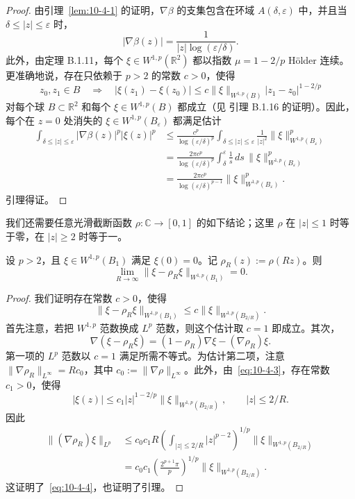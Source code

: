 \begin{proof}
由引理~\ref{lem:10-4-1} 的证明，$\nabla\beta$ 的支集包含在环域
$A(\delta,\varepsilon)$ 中，并且当 $\delta\le|z|\le\varepsilon$ 时，
\[
  |\nabla\beta(z)|=\frac{1}{|z|\log(\varepsilon/\delta)}.
\]
此外，由定理 B.1.11，每个 $\xi\in W^{1,p}(\mathbb R^2)$ 都以指数
$\mu=1-2/p$ Hölder 连续。更准确地说，存在只依赖于 $p>2$ 的常数 $c>0$，使得
\begin{equation}\label{eq:10-4-3}
  z_0,z_1\in B
  \quad\Longrightarrow\quad
  |\xi(z_1)-\xi(z_0)|
  \le c\|\xi\|_{W^{1,p}(B)}|z_1-z_0|^{1-2/p}
\end{equation}
对每个球 $B\subset\mathbb R^2$ 和每个 $\xi\in W^{1,p}(B)$ 都成立（见
引理 B.1.16 的证明）。因此，每个在 $z=0$ 处消失的
$\xi\in W^{1,p}(B_\varepsilon)$ 都满足估计
\[
  \begin{aligned}
  \int_{\delta\le|z|\le\varepsilon}
  |\nabla\beta(z)|^p|\xi(z)|^p
  &\le
  \frac{c^p}{\log(\varepsilon/\delta)^p}
  \int_{\delta\le|z|\le\varepsilon}\frac{1}{|z|^2}
  \|\xi\|_{W^{1,p}(B_\varepsilon)}^p\\
  &=\frac{2\pi c^p}{\log(\varepsilon/\delta)^p}
  \int_\delta^\varepsilon\frac1s\,ds\,
  \|\xi\|_{W^{1,p}(B_\varepsilon)}^p\\
  &=\frac{2\pi c^p}{\log(\varepsilon/\delta)^{p-1}}
  \|\xi\|_{W^{1,p}(B_\varepsilon)}^p.
  \end{aligned}
\]
引理得证。
\end{proof}

我们还需要任意光滑截断函数 $\rho:\mathbb C\to[0,1]$ 的如下结论；这里 $\rho$ 在
$|z|\le1$ 时等于零，在 $|z|\ge2$ 时等于一。

\begin{lemma}\label{lem:10-4-3}
设 $p>2$，且 $\xi\in W^{1,p}(B_1)$ 满足 $\xi(0)=0$。记
$\rho_R(z):=\rho(Rz)$。则
\[
  \lim_{R\to\infty}\|\xi-\rho_R\xi\|_{W^{1,p}(B_1)}=0.
\]
\end{lemma}

\begin{proof}
我们证明存在常数 $c>0$，使得
\begin{equation}\label{eq:10-4-4}
  \|\xi-\rho_R\xi\|_{W^{1,p}(B_1)}
  \le c\|\xi\|_{W^{1,p}(B_{2/R})}.
\end{equation}
首先注意，若把 $W^{1,p}$ 范数换成 $L^p$ 范数，则这个估计取 $c=1$ 即成立。其次，
\[
  \nabla(\xi-\rho_R\xi)
  =(1-\rho_R)\nabla\xi-(\nabla\rho_R)\xi.
\]
第一项的 $L^p$ 范数以 $c=1$ 满足所需不等式。为估计第二项，注意
$\|\nabla\rho_R\|_{L^\infty}=Rc_0$，其中
$c_0:=\|\nabla\rho\|_{L^\infty}$。此外，由~\eqref{eq:10-4-3}，存在常数 $c_1>0$，使得
\[
  |\xi(z)|
  \le c_1|z|^{1-2/p}\|\xi\|_{W^{1,p}(B_{2/R})},
  \qquad |z|\le2/R.
\]
因此
\[
  \begin{aligned}
  \|(\nabla\rho_R)\xi\|_{L^p}
  &\le c_0c_1R
  \left(\int_{|z|\le2/R}|z|^{p-2}\right)^{1/p}
  \|\xi\|_{W^{1,p}(B_{2/R})}\\
  &=c_0c_1\left(\frac{2^{p+1}\pi}{p}\right)^{1/p}
  \|\xi\|_{W^{1,p}(B_{2/R})}.
  \end{aligned}
\]
这证明了~\eqref{eq:10-4-4}，也证明了引理。
\end{proof}
